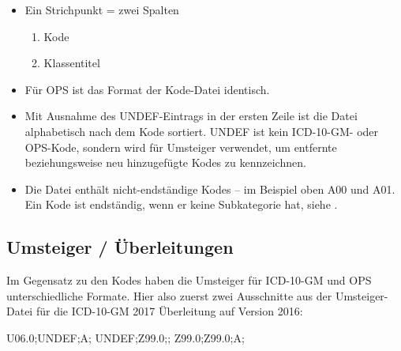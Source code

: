 \begin{itemize}
\item Ein Strichpunkt = zwei Spalten
\begin{enumerate}
\item Kode
\item Klassentitel
\end{enumerate}
\item Für OPS ist das Format der Kode-Datei identisch.
\item Mit Ausnahme des UNDEF-Eintrags in der ersten Zeile ist die Datei alphabetisch nach dem Kode sortiert. UNDEF ist kein ICD-10-GM- oder OPS-Kode, sondern wird für Umsteiger verwendet, um entfernte beziehungsweise neu hinzugefügte Kodes zu kennzeichnen.
\item Die Datei enthält nicht-endständige Kodes -- im Beispiel oben A00 und A01. Ein Kode ist endständig, wenn er keine Subkategorie hat, siehe \cite[Kategorie und Kode in der ICD-10-GM]{bfarmicdkk}.
\end{itemize}

\subsection{Umsteiger / Überleitungen}

Im Gegensatz zu den Kodes haben die Umsteiger für ICD-10-GM und OPS unterschiedliche Formate. Hier also zuerst zwei Ausschnitte aus der Umsteiger-Datei für die ICD-10-GM 2017 Überleitung auf Version 2016:

{U06.0;UNDEF;A;\newline
UNDEF;Z99.0;;\newline
Z99.0;Z99.0;A;
}

